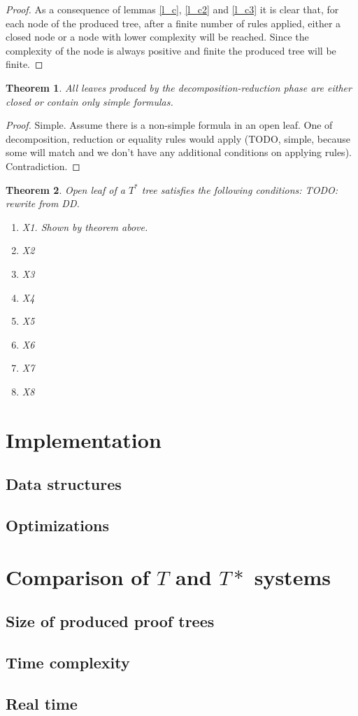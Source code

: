 \documentclass{article}
\newtheorem{theorem}{Theorem}
\theoremstyle{definition}
\newcommand*{\Ts}{T^*}
\begin{document}
\begin{proof}
    As a consequence of lemmas \ref{l_c}, \ref{l_c2} and \ref{l_c3} it is clear that, for each node of the produced tree, after a finite number of rules applied, either a closed node or a node with lower complexity will be reached. Since the complexity of the node is always positive and finite the produced tree will be finite.

\end{proof}

\begin{theorem}
    All leaves produced by the decomposition-reduction phase are either closed or contain only simple formulas.
\end{theorem}
\begin{proof}
    Simple. Assume there is a non-simple formula in an open leaf. One of decomposition, reduction or equality rules would apply (TODO, simple, because some will match and we don't have any additional conditions on applying rules). Contradiction.
\end{proof}

\begin{theorem}
    Open leaf of a $\Ts$ tree satisfies the following conditions:
    TODO: rewrite from DD.
    \begin{enumerate}
        \item X1. Shown by theorem above.
        \item X2
        \item X3
        \item X4
        \item X5
        \item X6
        \item X7
        \item X8
    \end{enumerate}
\end{theorem}

\section{Implementation}
\subsection{Data structures}
\subsection{Optimizations}
\section{Comparison of $T$ and $T*$ systems}
\subsection{Size of produced proof trees}
\subsection{Time complexity}
\subsection{Real time}
\end{document}
